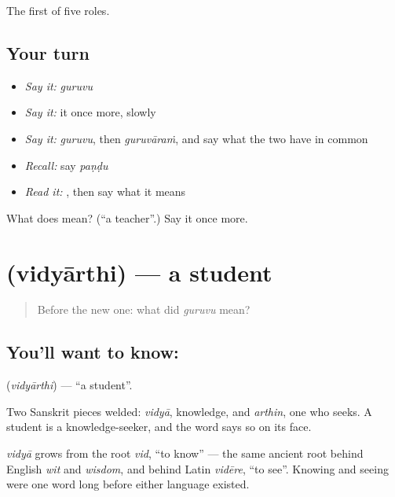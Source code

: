 \begin{grammarlens}[title={What you've built}]
The first of five roles.
\end{grammarlens}

\subsection*{Your turn}
\begin{itemize}
\raggedright
  \item \emph{Say it:} \emph{guruvu}
  \item \emph{Say it:} it once more, slowly
  \item \emph{Say it:} \emph{guruvu}, then \emph{guruvāraṁ}, and say what the two have in common
  \item \emph{Recall:} say \emph{paṇḍu}
  \item \emph{Read it:} \textbf{}, then say what it means
\end{itemize}

\begin{tcolorbox}[breakable,colback=teal!4,colframe=teal!35!black,title={Before you move on}]
What does  mean? (\textquotedblleft{}a teacher\textquotedblright{}.) Say it once more.
\end{tcolorbox}
\section[\texorpdfstring{\te{విద్యార్థి} (vidyārthi)}{విద్యార్థి (vidyārthi)}]{ (vidyārthi) — a student}

\label{lesson:TE-C48-student}



\begin{quote}
Before the new one: what did \emph{guruvu} mean?
\end{quote}

\subsection*{You'll want to know: }
\textbf{} (\emph{vidyārthi}) — \textquotedblleft{}a student\textquotedblright{}.

Two Sanskrit pieces welded: \emph{vidyā}, knowledge, and \emph{arthin}, one who seeks. A student is a knowledge-seeker, and the word says so on its face.

\emph{vidyā} grows from the root \emph{vid}, \textquotedblleft{}to know\textquotedblright{} — the same ancient root behind English \emph{wit} and \emph{wisdom}, and behind Latin \emph{vidēre}, \textquotedblleft{}to see\textquotedblright{}. Knowing and seeing were one word long before either language existed.

